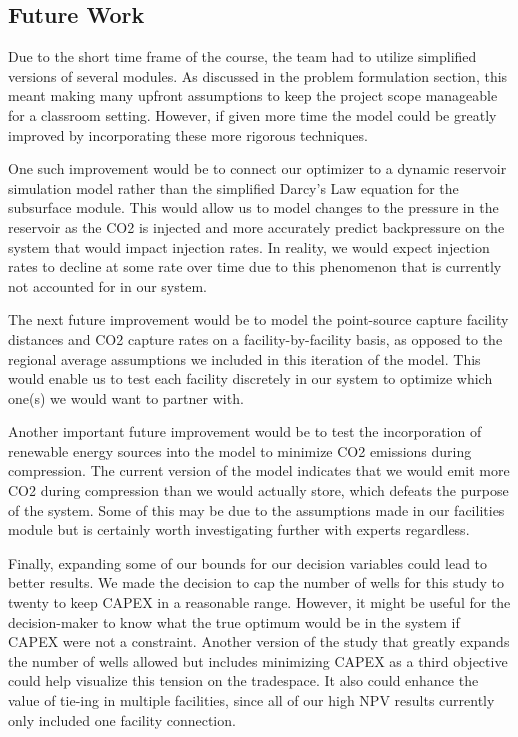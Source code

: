 \documentclass[balance,upint,subscriptcorrection,varvw,mathalfa=cal=boondoxo,spanish,french,vietnamese,russian,greek,pdf-a,colorlinks]{asmeconf}
\begin{document}
\subsection{Future Work}
Due to the short time frame of the course, the team had to utilize simplified versions of several modules. As discussed in the problem formulation section, this meant making many upfront assumptions to keep the project scope manageable for a classroom setting. However, if given more time the model could be greatly improved by incorporating these more rigorous techniques.

One such improvement would be to connect our optimizer to a dynamic reservoir simulation model rather than the simplified Darcy's Law equation for the subsurface module. This would allow us to model changes to the pressure in the reservoir as the CO2 is injected and more accurately predict backpressure on the system that would impact injection rates. In reality, we would expect injection rates to decline at some rate over time due to this phenomenon that is currently not accounted for in our system.

The next future improvement would be to model the point-source capture facility distances and CO2 capture rates on a facility-by-facility basis, as opposed to the regional average assumptions we included in this iteration of the model. This would enable us to test each facility discretely in our system to optimize which one(s) we would want to partner with.

Another important future improvement would be to test the incorporation of renewable energy sources into the model to minimize CO2 emissions during compression. The current version of the model indicates that we would emit more CO2 during compression than we would actually store, which defeats the purpose of the system. Some of this may be due to the assumptions made in our facilities module but is certainly worth investigating further with experts regardless.

Finally, expanding some of our bounds for our decision variables could lead to better results. We made the decision to cap the number of wells for this study to twenty to keep CAPEX in a reasonable range. However, it might be useful for the decision-maker to know what the true optimum would be in the system if CAPEX were not a constraint. Another version of the study that greatly expands the number of wells allowed but includes minimizing CAPEX as a third objective could help visualize this tension on the tradespace. It also could enhance the value of tie-ing in multiple facilities, since all of our high NPV results currently only included one facility connection.
\end{document}
